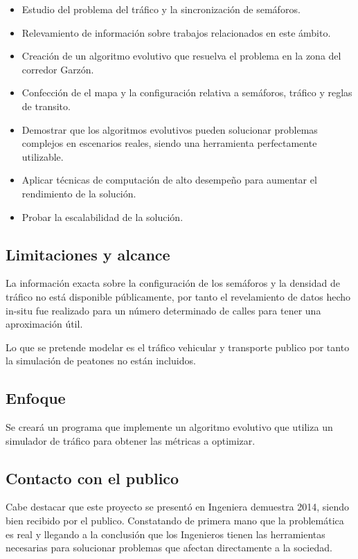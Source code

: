 \begin{itemize}
	\item Estudio del problema del tráfico y la sincronización de semáforos.
	\item Relevamiento de información sobre trabajos relacionados en este ámbito.
	\item Creación de un algoritmo evolutivo que resuelva el problema en la zona del corredor Garzón.
	\item Confección de el mapa y la configuración relativa a semáforos, tráfico y reglas de transito.	
	\item Demostrar que los algoritmos evolutivos pueden solucionar problemas complejos en escenarios  reales, siendo una herramienta perfectamente utilizable.
	\item Aplicar técnicas de computación de alto desempeño para aumentar el rendimiento de la solución.
	\item Probar la escalabilidad de la solución.
\end{itemize}

\subsection{Limitaciones y alcance}
La información exacta sobre la configuración de los semáforos y la densidad de tráfico no está disponible públicamente, por tanto el revelamiento de datos hecho in-situ fue realizado para un número determinado de calles para tener una aproximación útil.

Lo que se pretende modelar es el tráfico vehicular y transporte publico por tanto la simulación de peatones no están incluidos.

 
\subsection{Enfoque}
Se creará un programa que implemente un algoritmo evolutivo  que utiliza un simulador de tráfico para obtener las métricas a optimizar.


\subsection{Contacto con el publico}
Cabe destacar que este proyecto se presentó en Ingeniera demuestra 2014, siendo bien recibido por el publico. Constatando de primera mano que la problemática es real y llegando a la conclusión que los Ingenieros tienen las herramientas necesarias para solucionar problemas que afectan directamente a la sociedad.

